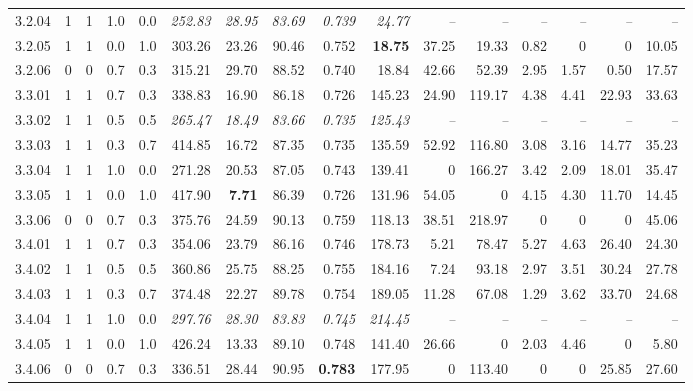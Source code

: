 \begin{table}[!t]
\begin{tabular}{@{}lllllrrrrrrrrrrr@{}}
    3.2.04 & 1 & 1 & 1.0 & 0.0 & \textit{252.83} & \textit{28.95} & \textit{83.69} & \textit{0.739} & \textit{24.77} & \textit{--} & \textit{--} & \textit{--} & \textit{--} & \textit{--} & \textit{--} \\
    3.2.05 & 1 & 1 & 0.0 & 1.0 & 303.26 & 23.26 & 90.46 & 0.752 & \textbf{18.75} & 37.25 & 19.33 & 0.82 & 0 & 0 & 10.05 \\
    3.2.06 & 0 & 0 & 0.7 & 0.3 & 315.21 & 29.70 & 88.52 & 0.740 & 18.84 & 42.66 & 52.39 & 2.95 & 1.57 & 0.50 & 17.57 \\
    3.3.01 & 1 & 1 & 0.7 & 0.3 & 338.83 & 16.90 & 86.18 & 0.726 & 145.23 & 24.90 & 119.17 & 4.38 & 4.41 & 22.93 & 33.63 \\
    3.3.02 & 1 & 1 & 0.5 & 0.5 & \textit{265.47} & \textit{18.49} & \textit{83.66} & \textit{0.735} & \textit{125.43} & \textit{--} & \textit{--} & \textit{--} & \textit{--} & \textit{--} & \textit{--} \\
    3.3.03 & 1 & 1 & 0.3 & 0.7 & 414.85 & 16.72 & 87.35 & 0.735 & 135.59 & 52.92 & 116.80 & 3.08 & 3.16 & 14.77 & 35.23 \\
    3.3.04 & 1 & 1 & 1.0 & 0.0 & 271.28 & 20.53 & 87.05 & 0.743 & 139.41 & 0 & 166.27 & 3.42 & 2.09 & 18.01 & 35.47 \\
    3.3.05 & 1 & 1 & 0.0 & 1.0 & 417.90 & \textbf{7.71} & 86.39 & 0.726 & 131.96 & 54.05 & 0 & 4.15 & 4.30 & 11.70 & 14.45 \\
    3.3.06 & 0 & 0 & 0.7 & 0.3 & 375.76 & 24.59 & 90.13 & 0.759 & 118.13 & 38.51 & 218.97 & 0 & 0 & 0 & 45.06 \\
    3.4.01 & 1 & 1 & 0.7 & 0.3 & 354.06 & 23.79 & 86.16 & 0.746 & 178.73 & 5.21 & 78.47 & 5.27 & 4.63 & 26.40 & 24.30 \\
    3.4.02 & 1 & 1 & 0.5 & 0.5 & 360.86 & 25.75 & 88.25 & 0.755 & 184.16 & 7.24 & 93.18 & 2.97 & 3.51 & 30.24 & 27.78 \\
    3.4.03 & 1 & 1 & 0.3 & 0.7 & 374.48 & 22.27 & 89.78 & 0.754 & 189.05 & 11.28 & 67.08 & 1.29 & 3.62 & 33.70 & 24.68 \\
    3.4.04 & 1 & 1 & 1.0 & 0.0 & \textit{297.76} & \textit{28.30} & \textit{83.83} & \textit{0.745} & \textit{214.45} & \textit{--} & \textit{--} & \textit{--} & \textit{--} & \textit{--} & \textit{--} \\
    3.4.05 & 1 & 1 & 0.0 & 1.0 & 426.24 & 13.33 & 89.10 & 0.748 & 141.40 & 26.66 & 0 & 2.03 & 4.46 & 0 & 5.80 \\
    3.4.06 & 0 & 0 & 0.7 & 0.3 & 336.51 & 28.44 & 90.95 & \textbf{0.783} & 177.95 & 0 & 113.40 & 0 & 0 & 25.85 & 27.60 \\
\hline
\end{tabular}
\end{table}